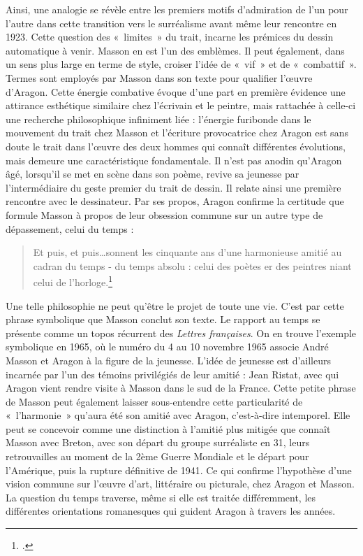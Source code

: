 	Ainsi, une analogie se révèle entre les premiers motifs d’admiration de l’un pour l’autre dans cette transition vers le surréalisme avant même leur rencontre en 1923. Cette question des « limites » du trait, incarne les prémices du dessin automatique à venir. Masson en est l’un des emblèmes. Il peut également, dans un sens plus large en terme de style, croiser l’idée de « vif » et de « combattif ». Termes sont employés par Masson dans son texte pour qualifier l’\oe{}uvre d’Aragon. Cette énergie combative évoque d’une part en première évidence une attirance esthétique similaire chez l’écrivain et le peintre, mais rattachée à celle-ci une recherche philosophique infiniment liée : l’énergie furibonde dans le mouvement du trait chez Masson et l’écriture provocatrice chez Aragon est sans doute le trait dans l’\oe{}uvre des deux hommes qui connaît différentes évolutions, mais demeure une caractéristique fondamentale. Il n’est pas anodin qu’Aragon âgé, lorsqu'il se met en scène dans son poème, revive sa jeunesse par l’intermédiaire du geste premier du trait de dessin. Il relate ainsi une première rencontre avec le dessinateur. Par ses propos, Aragon confirme la certitude que formule Masson à propos de leur obsession commune sur un autre type de dépassement, celui du temps : 
\begin{verse}    
Et puis, et puis…sonnent les cinquante ans d’une harmonieuse amitié au cadran du temps - du temps absolu : celui des poètes er des peintres niant celui de l’horloge.\footcite[p84]{rebelle}\end{verse}


	Une telle philosophie ne peut qu’être le projet de toute une vie. C’est par cette phrase symbolique que Masson conclut son texte. Le rapport au temps se présente comme un topos récurrent des \emph{Lettres françaises}. On en trouve l'exemple symbolique en 1965, où le numéro du 4 au 10 novembre 1965 associe André Masson et Aragon à la figure de la jeunesse. L'idée de jeunesse est d'ailleurs incarnée par l'un des témoins privilégiés de leur amitié : Jean Ristat, avec qui Aragon vient rendre visite à Masson dans le sud de la France. Cette petite phrase de Masson peut également laisser sous-entendre cette particularité de « l’harmonie » qu’aura été son amitié avec Aragon, c’est-à-dire intemporel. Elle peut se concevoir comme une distinction à l’amitié plus mitigée que connaît Masson avec Breton, avec son départ du groupe surréaliste en 31, leurs retrouvailles au moment de la 2ème Guerre Mondiale et le départ pour l’Amérique, puis la rupture définitive de 1941. Ce qui confirme l’hypothèse d’une vision commune sur l’\oe{}uvre d’art, littéraire ou picturale, chez Aragon et Masson. La question du temps traverse, même si elle est traitée différemment, les différentes orientations romanesques qui guident Aragon à travers les années.

